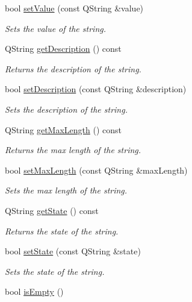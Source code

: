 \begin{DoxyCompactItemize}
bool \mbox{\hyperlink{classString_ae863781e31fe2378468547159a9172a6}{set\+Value}} (const Q\+String \&value)
\begin{DoxyCompactList}\small\item\em Sets the value of the string. \end{DoxyCompactList}\item 
Q\+String \mbox{\hyperlink{classString_ae604e3af13ef6ba3113a7484edfc3c55}{get\+Description}} () const
\begin{DoxyCompactList}\small\item\em Returns the description of the string. \end{DoxyCompactList}\item 
bool \mbox{\hyperlink{classString_ac91f0504a470b1602952cfd657979e4b}{set\+Description}} (const Q\+String \&description)
\begin{DoxyCompactList}\small\item\em Sets the description of the string. \end{DoxyCompactList}\item 
Q\+String \mbox{\hyperlink{classString_af95fe7d7e2a8b604d7af3b7f0476ec0e}{get\+Max\+Length}} () const
\begin{DoxyCompactList}\small\item\em Returns the max length of the string. \end{DoxyCompactList}\item 
bool \mbox{\hyperlink{classString_a141c695ac9095099e0d27a3f1b01a1ca}{set\+Max\+Length}} (const Q\+String \&max\+Length)
\begin{DoxyCompactList}\small\item\em Sets the max length of the string. \end{DoxyCompactList}\item 
Q\+String \mbox{\hyperlink{classString_ae5ee38919f5a360e0283baedb11c48e0}{get\+State}} () const
\begin{DoxyCompactList}\small\item\em Returns the state of the string. \end{DoxyCompactList}\item 
bool \mbox{\hyperlink{classString_a7b1b070889aef0e2e9eb4d7d55161cf3}{set\+State}} (const Q\+String \&state)
\begin{DoxyCompactList}\small\item\em Sets the state of the string. \end{DoxyCompactList}\item 
bool \mbox{\hyperlink{classString_a43fe9257fb504215834afa322313f8c9}{is\+Empty}} ()

\end{DoxyCompactItemize}
